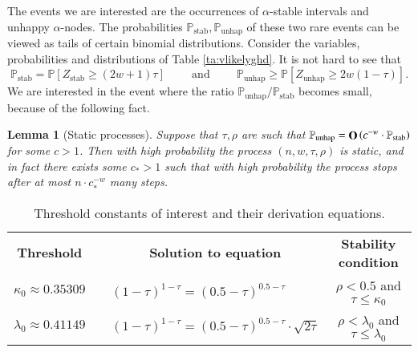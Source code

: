 \documentclass[11pt]{article}
\theoremstyle{plain}
\newtheorem{lem}[thm]{Lemma}
\numberwithin{equation}{subsection}
\newcommand{\bigo}[1]{\mathop{\bf O}\/\left({#1}\right)}
\newcommand{\Punhap}{\mathbb{P}_{\textrm{unhap}}}
\newcommand{\Pstab}{\mathbb{P}_{\textrm{stab}}}
\DeclareRobustCommand{\proba}[2][{\mbox{$\mathbb{P}$}}]{\ensuremath {#1} [ {#2} ]}
\begin{document}
The events we are interested are the occurrences of $\alpha$-stable intervals and
unhappy $\alpha$-nodes. 
The probabilities $\Pstab, \Punhap$ of these two rare events can be viewed as tails of certain
binomial distributions.
Consider the variables, probabilities and distributions of Table \ref{ta:vlikelyghd}.
It is not hard to see that
\[
\Pstab=\proba{Z_{\textrm{stab}}\geq (2w+1)\tau}
\hspace{1cm}
\textrm{and}
\hspace{1cm}
\Punhap\geq 
\proba{Z_{\textrm{unhap}}\geq 2w(1-\tau)}.
\]
We are interested in the event where the ratio 
$\Punhap/\Pstab$ becomes small, because of the following fact.
\begin{lem}[Static processes]
Suppose that $\tau, \rho$ are such that
 $\Punhap=
 \bigo{c^{-w}\cdot \Pstab}$
for some $c >1$. 
Then 
with high probability the
 process $(n,w,\tau, \rho)$ is static,
 and in fact there exists some
$c_{\ast}>1$ such that with high probability 
the process stops after at most $n\cdot c_{\ast}^{-w}$ 
many steps.
\end{lem}

\begin{table}\caption{Threshold constants of interest and their derivation equations.}
\label{ta:constantthresint}
\colorbox{black!10}{ 
  \begin{tabular}{cclc}
\multicolumn{1}{c}{\bf\small Threshold}  &  &\multicolumn{1}{c}{\bf\small Solution to equation} & 
{\bf\small Stability condition}\\[1ex]
 \cmidrule{1-4}
{\small  $\kappa_0\approx 0.35309$\hspace{0.1cm}}&&
{\small $(1-\tau)^{1-\tau}=(0.5-\tau)^{0.5-\tau}$} & 
{\small $\rho<0.5$ \hspace{0.2cm}and \hspace{0.2cm}$\tau\leq\kappa_0$}\\[1ex]
{\small $\lambda_0 \approx 0.41149$}\hspace{0.1cm} && 
{\small $(1-\tau)^{1-\tau}= \left(0.5-\tau\right)^{0.5-\tau} \cdot \sqrt{2\tau}$\hspace{0.4cm}} &	
{\small $\rho<\lambda_0$ \hspace{0.3cm}and\hspace{0.2cm} $\tau \leq \lambda_0$}\\[1ex]
\end{tabular}}
\centering
\end{table}
\end{document}
